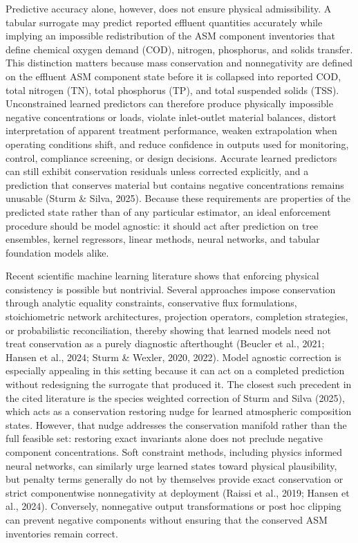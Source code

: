 \documentclass[a4paper,fleqn]{cas-sc}
\begin{document}
Predictive accuracy alone, however, does not ensure physical admissibility. A tabular surrogate may predict reported effluent quantities accurately while implying an impossible redistribution of the ASM component inventories that define chemical oxygen demand (COD), nitrogen, phosphorus, and solids transfer. This distinction matters because mass conservation and nonnegativity are defined on the effluent ASM component state before it is collapsed into reported COD, total nitrogen (TN), total phosphorus (TP), and total suspended solids (TSS). Unconstrained learned predictors can therefore produce physically impossible negative concentrations or loads, violate inlet-outlet material balances, distort interpretation of apparent treatment performance, weaken extrapolation when operating conditions shift, and reduce confidence in outputs used for monitoring, control, compliance screening, or design decisions. Accurate learned predictors can still exhibit conservation residuals unless corrected explicitly, and a prediction that conserves material but contains negative concentrations remains unusable (Sturm \& Silva, 2025). Because these requirements are properties of the predicted state rather than of any particular estimator, an ideal enforcement procedure should be model agnostic: it should act after prediction on tree ensembles, kernel regressors, linear methods, neural networks, and tabular foundation models alike.

Recent scientific machine learning literature shows that enforcing physical consistency is possible but nontrivial. Several approaches impose conservation through analytic equality constraints, conservative flux formulations, stoichiometric network architectures, projection operators, completion strategies, or probabilistic reconciliation, thereby showing that learned models need not treat conservation as a purely diagnostic afterthought (Beucler et al., 2021; Hansen et al., 2024; Sturm \& Wexler, 2020, 2022). Model agnostic correction is especially appealing in this setting because it can act on a completed prediction without redesigning the surrogate that produced it. The closest such precedent in the cited literature is the species weighted correction of Sturm and Silva (2025), which acts as a conservation restoring nudge for learned atmospheric composition states. However, that nudge addresses the conservation manifold rather than the full feasible set: restoring exact invariants alone does not preclude negative component concentrations. Soft constraint methods, including physics informed neural networks, can similarly urge learned states toward physical plausibility, but penalty terms generally do not by themselves provide exact conservation or strict componentwise nonnegativity at deployment (Raissi et al., 2019; Hansen et al., 2024). Conversely, nonnegative output transformations or post hoc clipping can prevent negative components without ensuring that the conserved ASM inventories remain correct.
\end{document}
